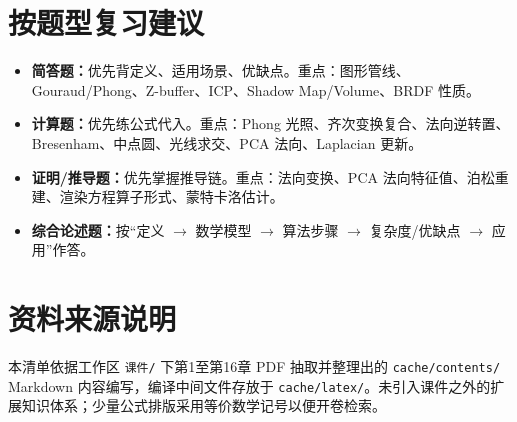 \documentclass[UTF8,fontset=fandol,11pt]{ctexart}
\newcommand{\key}[1]{\textbf{#1}}
\begin{document}
\section{按题型复习建议}
\begin{itemize}
  \item \key{简答题：}优先背定义、适用场景、优缺点。重点：图形管线、Gouraud/Phong、Z-buffer、ICP、Shadow Map/Volume、BRDF 性质。
  \item \key{计算题：}优先练公式代入。重点：Phong 光照、齐次变换复合、法向逆转置、Bresenham、中点圆、光线求交、PCA 法向、Laplacian 更新。
  \item \key{证明/推导题：}优先掌握推导链。重点：法向变换、PCA 法向特征值、泊松重建、渲染方程算子形式、蒙特卡洛估计。
  \item \key{综合论述题：}按``定义 $\rightarrow$ 数学模型 $\rightarrow$ 算法步骤 $\rightarrow$ 复杂度/优缺点 $\rightarrow$ 应用''作答。
\end{itemize}

\section{资料来源说明}
本清单依据工作区 \texttt{课件/} 下第1至第16章 PDF 抽取并整理出的 \texttt{cache/contents/} Markdown 内容编写，编译中间文件存放于 \texttt{cache/latex/}。未引入课件之外的扩展知识体系；少量公式排版采用等价数学记号以便开卷检索。
\end{document}
